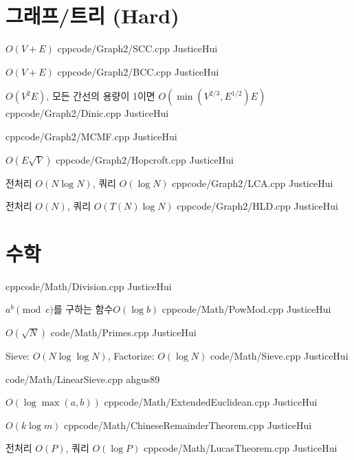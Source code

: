 \documentclass[landscape, 8pt, a4paper, twocolumn]{extarticle} %
\begin{document}
\section{그래프/트리 (Hard)}

{}{$O(V+E)$}
{cpp}{code/Graph2/SCC.cpp}
{JusticeHui}

{}{$O(V+E)$}
{cpp}{code/Graph2/BCC.cpp}
{JusticeHui}

{}{$O(V^2E)$, 모든 간선의 용량이 1이면 $O(\min(V^{2/3},E^{1/2})E)$}
{cpp}{code/Graph2/Dinic.cpp}
{JusticeHui}

{}{}
{cpp}{code/Graph2/MCMF.cpp}
{JusticeHui}

{}{$O(E \sqrt V)$}
{cpp}{code/Graph2/Hopcroft.cpp}
{JusticeHui}

{}{전처리 $O(N \log N)$, 쿼리 $O(\log N)$}
{cpp}{code/Graph2/LCA.cpp}
{JusticeHui}

{}{전처리 $O(N)$, 쿼리 $O(T(N) \log N)$}
{cpp}{code/Graph2/HLD.cpp}
{JusticeHui}

\section{수학}

{}{}
{cpp}{code/Math/Division.cpp}
{JusticeHui}

{$a^b \pmod c$를 구하는 함수}{$O(\log b)$}
{cpp}{code/Math/PowMod.cpp}
{JusticeHui}

{}{$O(\sqrt N)$}
{}{code/Math/Primes.cpp}
{JusticeHui}

{}{Sieve: $O(N \log \log N)$, Factorize: $O(\log N)$}
{}{code/Math/Sieve.cpp}
{JusticeHui}

{}{}
{}{code/Math/LinearSieve.cpp}
{ahgus89}

{}{$O(\log \max(a,b))$}
{cpp}{code/Math/ExtendedEuclidean.cpp}
{JusticeHui}

{}{$O(k \log m)$}
{cpp}{code/Math/ChineseRemainderTheorem.cpp}
{JusticeHui}

{}{전처리 $O(P)$, 쿼리 $O(\log P)$}
{cpp}{code/Math/LucasTheorem.cpp}
{JusticeHui}
\end{document}
